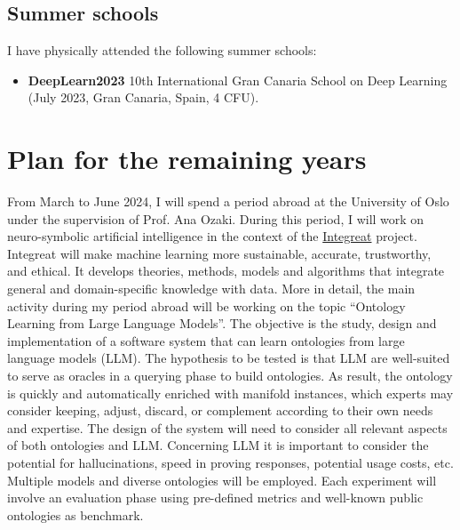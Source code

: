 \documentclass[]{scrartcl}
\begin{document}
    \subsection{Summer schools}
    \label{sec:done:summerschools}
    I have physically attended the following summer schools:
    \begin{itemize}
        \item \textbf{DeepLearn2023} 10th International Gran Canaria School on Deep Learning (July 2023, Gran Canaria, Spain, 4 CFU).
    \end{itemize}

    \section{Plan for the remaining years}
    \label{sec:todo}
    From March to June 2024, I will spend a period abroad at the University of Oslo under the supervision of Prof. Ana Ozaki.
    During this period, I will work on neuro-symbolic artificial intelligence in the context of the \href{https://www.integreat.no/index.html}{Integreat} project.
    Integreat will make machine learning more sustainable, accurate, trustworthy, and ethical.
    It develops theories, methods, models and algorithms that integrate general and domain-specific knowledge with data.
    More in detail, the main activity during my period abroad will be working on the topic ``Ontology Learning from Large Language Models''.
    The objective is the study, design and implementation of a software system that can learn ontologies from large language models (LLM).
    The hypothesis to be tested is that LLM are well-suited to serve as oracles in a querying phase to build ontologies.
    As result, the ontology is quickly and automatically enriched with manifold instances, which experts may consider keeping, adjust, discard, or complement according to their own needs and expertise.
    The design of the system will need to consider all relevant aspects of both ontologies and LLM.
    Concerning LLM it is important to consider the potential for hallucinations, speed in proving responses, potential usage costs, etc.
    Multiple models and diverse ontologies will be employed.
    Each experiment will involve an evaluation phase using pre-defined metrics and well-known public ontologies as benchmark.
\end{document}
